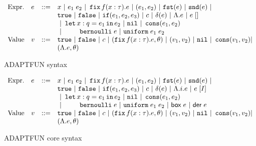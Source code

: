 \begin{figure}
    \centering
    \[\begin{array}{llll}
\mbox{Expr.} & \expr & ::= & x ~|~ \expr_1 \eapp \expr_2 ~|~ \efix f(x:\type).\expr
 ~|~ (\expr_1, \expr_2) ~|~ \eprojl(\expr) ~|~ \eprojr(\expr) ~| \\
%
& & & \etrue ~|~ \efalse ~|~ \eif(\expr_1, \expr_2, \expr_3) ~|~
\econst ~|~ \eop(\expr)  ~|~  \eilam \expr ~|~ \expr \eapp []  \\
& & & ~|~  \elet  x:q = \expr_1 \ein \expr_2  ~|~ \enil ~|~  \econs (
      \expr_1, \expr_2) \\
& & & ~|~  ~~~~~~~
 \bernoulli \eapp \expr ~|~ \uniform \eapp \expr_1 \eapp
      \expr_2  \\
%
\mbox{Value} & \valr & ::= & \etrue ~|~ \efalse ~|~ \econst ~|~
(\efix f(x:\type).\expr, \env) ~|~ (\valr_1, \valr_2) 
    ~|~ \enil ~|~ \econs (\valr_1, \valr_2) | \\
& & & (\eilam \expr , \env)  
\end{array}\]
    \caption{ADAPTFUN syntax}
    \label{fig:syntax}
\end{figure}
\begin{figure}
    \centering
    \[\begin{array}{llll}
\mbox{Expr.} & \expr & ::= & x ~|~ \expr_1 \eapp \expr_2 ~|~ \efix f(x:\type).\expr
 ~|~ (\expr_1, \expr_2) ~|~ \eprojl(\expr) ~|~ \eprojr(\expr) ~| \\
%
& & & \etrue ~|~ \efalse ~|~ \eif(\expr_1, \expr_2, \expr_3) ~|~
\econst ~|~ \eop(\expr)  ~|~  \eilam i. \expr ~|~ \expr \eapp [I]  \\
& & & ~|~  \elet  x:q = \expr_1 \ein \expr_2  ~|~ \enil ~|~  \econs (
      \expr_1, \expr_2) \\
& & & ~|~  ~~~~~~~
 \bernoulli \eapp \expr ~|~ \uniform \eapp \expr_1 \eapp
      \expr_2 ~|~ \cbox \eapp \expr ~|~ \cder \eapp \expr \\
%
\mbox{Value} & \valr & ::= & \etrue ~|~ \efalse ~|~ \econst ~|~
(\efix f(x:\type).\expr, \env) ~|~ (\valr_1, \valr_2) 
    ~|~ \enil ~|~ \econs (\valr_1, \valr_2) | \\
& & & (\eilam \expr , \env)  
\end{array}\]
    \caption{ADAPTFUN core syntax}
    \label{fig:algo-syntax}
\end{figure}

